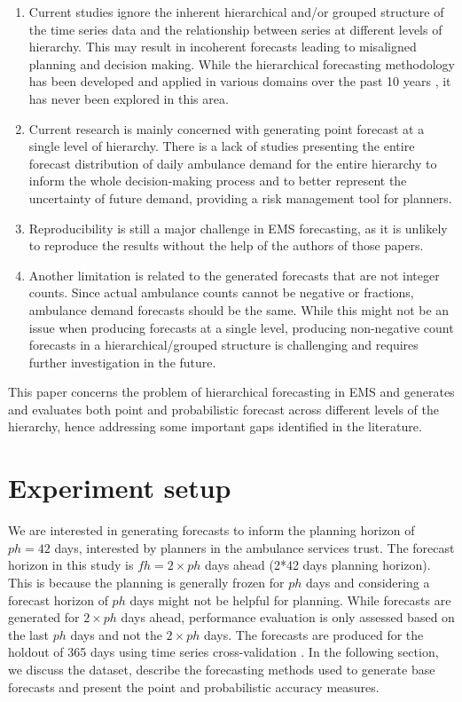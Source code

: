 \documentclass[
  authoryear,
  preprint,
  3p]{elsarticle}
\begin{document}
\begin{enumerate}
\def\labelenumi{\arabic{enumi}.}
\item
  Current studies ignore the inherent hierarchical and/or grouped
  structure of the time series data and the relationship between series
  at different levels of hierarchy. This may result in incoherent
  forecasts leading to misaligned planning and decision making. While
  the hierarchical forecasting methodology has been developed and
  applied in various domains over the past 10 years
  \citep{panagiotelis2022probabilistic}, it has never been explored in
  this area.
\item
  Current research is mainly concerned with generating point forecast at
  a single level of hierarchy. There is a lack of studies presenting the
  entire forecast distribution of daily ambulance demand for the entire
  hierarchy to inform the whole decision-making process and to better
  represent the uncertainty of future demand, providing a risk
  management tool for planners.
\item
  Reproducibility is still a major challenge in EMS forecasting, as it
  is unlikely to reproduce the results without the help of the authors
  of those papers.
\item
  Another limitation is related to the generated forecasts that are not
  integer counts. Since actual ambulance counts cannot be negative or
  fractions, ambulance demand forecasts should be the same. While this
  might not be an issue when producing forecasts at a single level,
  producing non-negative count forecasts in a hierarchical/grouped
  structure is challenging and requires further investigation in the
  future.
\end{enumerate}

This paper concerns the problem of hierarchical forecasting in EMS and
generates and evaluates both point and probabilistic forecast across
different levels of the hierarchy, hence addressing some important gaps
identified in the literature.

\hypertarget{sec-experiment}{%
\section{Experiment setup}\label{sec-experiment}}

We are interested in generating forecasts to inform the planning horizon
of \(ph= 42\) days, interested by planners in the ambulance services
trust. The forecast horizon in this study is \(fh = 2 \times ph\) days
ahead (2*42 days planning horizon). This is because the planning is
generally frozen for \(ph\) days and considering a forecast horizon of
\(ph\) days might not be helpful for planning. While forecasts are
generated for \(2 \times ph\) days ahead, performance evaluation is only
assessed based on the last \(ph\) days and not the \(2 \times ph\) days.
The forecasts are produced for the holdout of 365 days using time series
cross-validation \citep{hyndman2021forecasting}. In the following
section, we discuss the dataset, describe the forecasting methods used
to generate base forecasts and present the point and probabilistic
accuracy measures.
\end{document}
